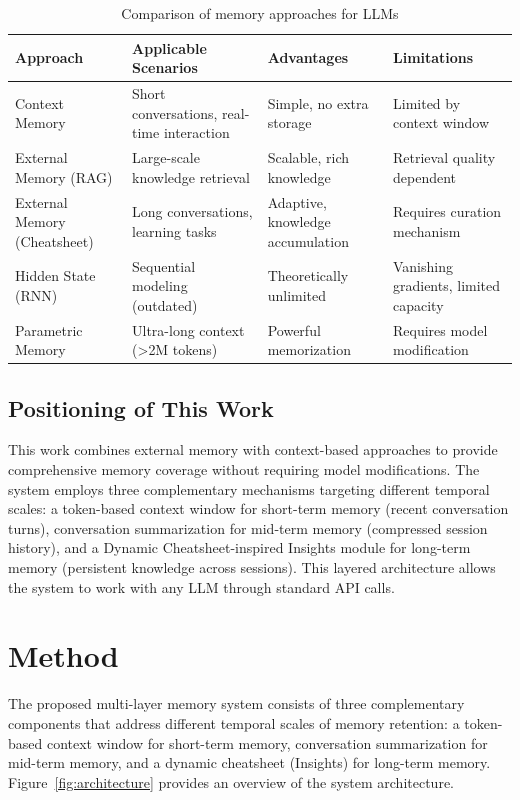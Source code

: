 \documentclass{article} %
\begin{document}
\begin{table}[H]
\caption{Comparison of memory approaches for LLMs}
\label{tab:memory_comparison}
\begin{center}
\begin{tabular}{p{2.5cm}p{3cm}p{3cm}p{3cm}}
\toprule
\textbf{Approach} & \textbf{Applicable Scenarios} & \textbf{Advantages} & \textbf{Limitations} \\
\midrule
Context Memory & Short conversations, real-time interaction & Simple, no extra storage & Limited by context window \\
External Memory (RAG) & Large-scale knowledge retrieval & Scalable, rich knowledge & Retrieval quality dependent \\
External Memory (Cheatsheet) & Long conversations, learning tasks & Adaptive, knowledge accumulation & Requires curation mechanism \\
Hidden State (RNN) & Sequential modeling (outdated) & Theoretically unlimited & Vanishing gradients, limited capacity \\
Parametric Memory & Ultra-long context ({>}2M tokens) & Powerful memorization & Requires model modification \\
\bottomrule
\end{tabular}
\end{center}
\end{table}

\subsection{Positioning of This Work}

This work combines external memory with context-based approaches to provide comprehensive memory coverage without requiring model modifications. The system employs three complementary mechanisms targeting different temporal scales: a token-based context window for short-term memory (recent conversation turns), conversation summarization for mid-term memory (compressed session history), and a Dynamic Cheatsheet-inspired Insights module for long-term memory (persistent knowledge across sessions). This layered architecture allows the system to work with any LLM through standard API calls.

\section{Method}
\label{sec:method}

The proposed multi-layer memory system consists of three complementary components that address different temporal scales of memory retention: a token-based context window for short-term memory, conversation summarization for mid-term memory, and a dynamic cheatsheet (Insights) for long-term memory. Figure~\ref{fig:architecture} provides an overview of the system architecture.
\end{document}
